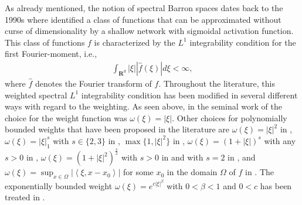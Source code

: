 \documentclass[a4paper]{article}
\newcommand{\rr}[1]{\mathbf{R}^{#1}}
\newcommand{\abs}[1]{| #1|}     %
\numberwithin{equation}{section}
\theoremstyle{remark}
\begin{document}
As already mentioned, the notion of spectral Barron spaces dates back to the 1990s where \citeauthor{Barron93UniversalApproximationBounds} \cite{Barron93UniversalApproximationBounds} identified a class of functions that can be approximated without curse of dimensionality by a shallow network with sigmoidal activation function.
This class of functions $f$ is characterized by the $L^1$ integrability condition for the first Fourier-moment, i.e.,
\begin{align}
\label{eq:original_barron}
    \int_{\rr{d}}\abs{\xi}\abs{\hat{f}(\xi)}d \xi<\infty,
\end{align}
where $\hat{f}$ denotes the Fourier transform of $f$.
Throughout the literature,
this weighted spectral $L^1$ integrability condition has been modified
in several different ways with regard to the weighting.
As seen above, in the seminal work of \citeauthor{Barron93UniversalApproximationBounds} \cite{Barron93UniversalApproximationBounds}
the choice for the weight function was $\omega(\xi)=\abs{\xi}$.
Other choices for polynomially bounded weights that have been proposed in the literature are
$\omega(\xi)=\abs{\xi}^2$
in \cite{Breiman93HingingHyperplanesRegression},
$\omega(\xi)=\abs{\xi}_1^s$ with $s\in\{2,3\}$
in \cite{Klusowski16RiskBoundsHighDimensional,Klusowski18ApproximationCombinationsReLU},
$\max\{1,\abs{\xi}^2\}$ 
in \cite{Gonon23RandomFeatureNeural},
$\omega(\xi)=(1+\abs{\xi})^s$ with any $s>0$
in \cite{Siegel20ApproximationRatesNeural,Siegel22HighOrderApproximationRates,Siegel22SharpBoundsApproximation,Siegel23CharacterizationVariationSpaces,Voigtlaender22SamplingNumbersFourierAnalytic,Xu20FiniteNeuronMethod},
$\omega(\xi)=(1+\abs{\xi}^2)^{\frac{s}{2}}$ with $s>0$
in \cite{Chen23RegularityTheoryStatic} and with $s=2$
in \cite{E22RepresentationFormulasPointwise},
and
$\omega(\xi)=\sup_{x\in\Omega}\abs{\left<\xi,x-x_0\right>}$ for some $x_0$ in the domain $\Omega$ of $f$
in \cite{Caragea23NeuralNetworkApproximation}.
The exponentially bounded weight 
$\omega(\xi)=e^{c\abs{\xi}^\beta}$ with $0<\beta<1$ and $0<c$ 
has been treated in \cite{Siegel22HighOrderApproximationRates}.
\end{document}
